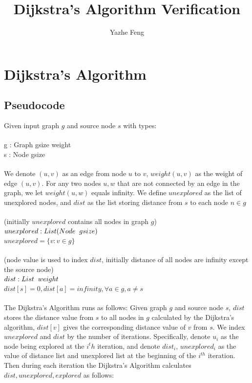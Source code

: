 \documentclass[11pt, oneside]{article}   	%
\title{Dijkstra's Algorithm Verification}
\author{Yazhe Feng}
\newcommand\tab[1][1cm]{\hspace*{#1}}
\newcommand\tsp[1][0.2cm]{\hspace*{#1}}
\theoremstyle{definition}
\begin{document}
\maketitle

\section{Dijkstra's Algorithm}
\subsection{Pseudocode}
Given input graph $g$ and source node $s$ with types:
\\\\
  \tab g : Graph gsize weight\\
  \tab s : Node gsize
\\\\
We denote $(u, v)$ as an edge from node $u$ to $v$, $weight(u, v)$ as the weight of edge $(u, v)$. For any two nodes $u, w$ that are not connected by an edge in the graph, we let $weight(u, w)$ equals infinity. We define $unexplored$ as the list of unexplored nodes, and $dist$ as the list storing distance from $s$ to each node $n \in g$
\\\\
\tab (initially $unexplored$ contains all nodes in graph $g$)\\
\tab $unexplored : List (Node \tsp gsize)$\\
\tab $unexplored = \{v : v \in g\}$
\\\\
\tab (node value is used to index $dist$, initially distance of all nodes are infinity except 
\\ \tab the source node)\\
\tab $dist : List \tsp weight$ \\
\tab $dist[s] = 0, dist[a] = infinity, \forall a \in g, a \neq s$
\\\\The Dijkstra's Algorithm runs as follows: 
Given graph $g$ and source node $s$, $dist$ stores the distance value from $s$ to all nodes in $g$ calculated by the Dijkstra's algorithm, $dist[v]$ gives the corresponding distance value of $v$ from $s$. We index $unexplored$ and $dist$ by the number of iterations. Specifically, denote $u_i$ as the node being explored at the $i^th$ iteration, and denote $dist_i$, $unexplored_i$ as the value of distance list and unexplored list at the beginning of the $i^{th}$ iteration. Then during each iteration the Dijkstra's Algorithm calculates $dist, unexplored, explored$ as follows:
\end{document}
